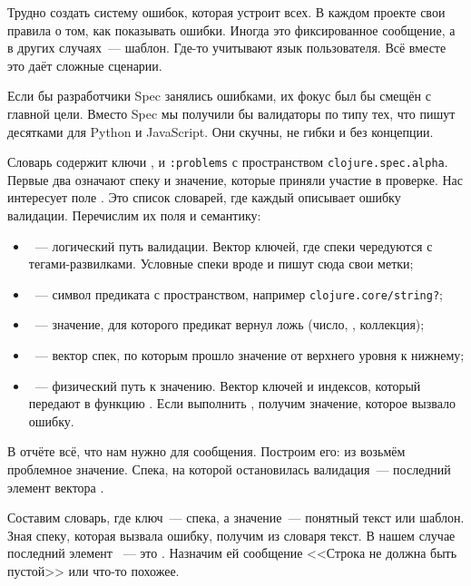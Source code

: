 Трудно создать систему ошибок, которая устроит всех. В каждом проекте свои
правила о том, как показывать ошибки. Иногда это фиксированное сообщение, а в
других случаях~--- шаблон. Где-то учитывают язык пользователя. Всё вместе это
даёт сложные сценарии.

Если бы разработчики Spec занялись ошибками, их фокус был бы смещён с главной
цели. Вместо Spec мы получили бы валидаторы по типу тех, что пишут десятками для
Python и JavaScript. Они скучны, не гибки и без концепции.

Словарь  содержит ключи ,  и
\texttt{:prob\-lems} с пространством \texttt{clojure.\-spec.\-alpha}. Первые два
означают спеку и значение, которые приняли участие в проверке. Нас интересует
поле . Это список словарей, где каждый описывает ошибку
валидации. Перечислим их поля и семантику:


\begin{itemize}

\item
  ~--- логический путь валидации. Вектор ключей, где спеки
  чередуются с тегами-развилками. Условные спеки вроде  и
   пишут сюда свои метки;

\item
  ~--- символ предиката с пространством, например
  \texttt{clo\-ju\-re.\-core/\-string?};

\item
  ~--- значение, для которого предикат вернул ложь (число,
  , коллекция);

\item
  ~--- вектор спек, по которым прошло значение от верхнего уровня к
  нижнему;

\item
  ~--- физический путь к значению. Вектор ключей и индексов, который
  передают в функцию . Если выполнить ,
  получим значение, которое вызвало ошибку.

\end{itemize}

В отчёте всё, что нам нужно для сообщения. Построим его: из  возьмём
проблемное значение. Спека, на которой остановилась валидация~--- последний
элемент вектора .

Составим словарь, где ключ~--- спека, а значение~--- понятный текст или
шаблон. Зная спеку, которая вызвала ошибку, получим из словаря текст. В нашем
случае последний элемент ~--- это . Назначим ей
сообщение <<Строка не должна быть пустой>> или что-то похожее.

